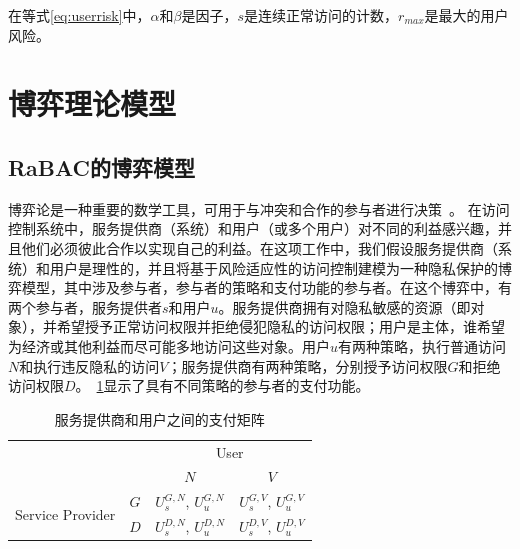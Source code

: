 在等式\ref{eq:userrisk}中，$\alpha$和$\beta$是因子，$s$是连续正常访问的计数，$r_{max}$是最大的用户风险。

\section{博弈理论模型}
\label{sec:gamemodel}

\subsection{RaBAC的博弈模型}

博弈论是一种重要的数学工具，可用于与冲突和合作的参与者进行决策~\cite{owen2001}。
在访问控制系统中，服务提供商（系统）和用户（或多个用户）对不同的利益感兴趣，并且他们必须彼此合作以实现自己的利益。在这项工作中，我们假设服务提供商（系统）和用户是理性的，并且将基于风险适应性的访问控制建模为一种隐私保护的博弈模型，其中涉及参与者，参与者的策略和支付功能的参与者。在这个博弈中，有两个参与者，服务提供者$s$和用户$u$。服务提供商拥有对隐私敏感的资源（即对象），并希望授予正常访问权限并拒绝侵犯隐私的访问权限；用户是主体，谁希望为经济或其他利益而尽可能多地访问这些对象。用户$u$有两种策略，执行普通访问$N$和执行违反隐私的访问$V$；服务提供商有两种策略，分别授予访问权限$G$和拒绝访问权限$D$。~\ref{tab:payoff}显示了具有不同策略的参与者的支付功能。
\begin{table}[htb]
	\caption{服务提供商和用户之间的支付矩阵}\label{tab:payoff}
	\centering 
	\begin{tabular}{cccc}
		\toprule
		\multicolumn{2}{c}{\multirow{2}{*}{}} & \multicolumn{2}{c}{User} \\
		\cline{3-4}
		& & $N$ & $V$ \\	
		\hline
		\multirow{2}{*}{Service Provider} & $G$ &$U_s^{G,N}$, $U_u^{G,N}$ & $U_s^{G,V}$, $U_u^{G,V}$\\
		\cline{2-4}
		& $D$ & $U_s^{D,N}$, $U_u^{D,N}$ & $U_s^{D,V}$, $U_u^{D,V}$\\
		\toprule
	\end{tabular}
\end{table}


